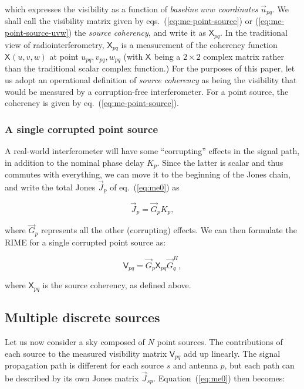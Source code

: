 \documentclass[]{aa}
\newcommand{\herm}{H}
\newcommand{\jones}[2]{\vec {#1}_{#2}}
\newcommand{\jonesT}[2]{\vec {#1}^{\herm}_{#2}}
\newcommand{\coh}[2]{\mathsf{{#1}}_{{#2}}}
\begin{document}
which expresses the visibility as a function of {\em baseline $uvw$ coordinates} $\vec u_{pq}$. We shall call the visibility matrix given by eqs.~(\ref{eq:me-point-source}) or (\ref{eq:me-point-source-uvw}) the {\em source coherency}, and write it as $\coh{X}{pq}$. In the traditional view of radiointerferometry, $\coh{X}{pq}$ is a measurement of the coherency function $\coh{X}{}(u,v,w)$ at point $u_{pq},v_{pq},w_{pq}$ (with $\coh{X}{}$ being a $2\times2$ complex matrix rather than the traditional scalar complex function.) For the purposes of this paper, let us adopt an operational definition of {\em source coherency} as being the visibility that would be measured by a corruption-free interferometer. For a point source, the coherency is given by eq.~(\ref{eq:me-point-source}).

\subsubsection{A single corrupted point source}

A real-world interferometer will have some ``corrupting'' effects in the signal path, in addition to the nominal phase delay $K_p$. Since the latter is scalar and thus commutes with everything, we can move it to the beginning of the Jones chain, and write the total Jones $\jones{J}{p}$ of eq.~(\ref{eq:me0}) as

\[
\jones{J}{p} = \jones{G}{p} K_p,
\]

where $\jones{G}{p}$ represents all the other (corrupting) effects. We can then formulate the RIME for a single corrupted point source as:

  \begin{equation}\label{eq:me-point-source-corrupted}
  \coh{V}{pq} = \jones{G}{p} \coh{X}{pq} \jonesT{G}{q},
  \end{equation}

where $\coh{X}{pq}$ is the source coherency, as defined above.
 

\subsection{Multiple discrete sources\label{sec:me-multiple-sources}}

Let us now consider a sky composed of $N$ point sources. The contributions of each source to the measured visibility matrix $\coh{V}{pq}$ add up linearly. The signal propagation path is different for each source $s$ and antenna $p$, but each path can be described by its own Jones matrix $\jones{J}{sp}$. Equation~(\ref{eq:me0}) then becomes:
\end{document}
